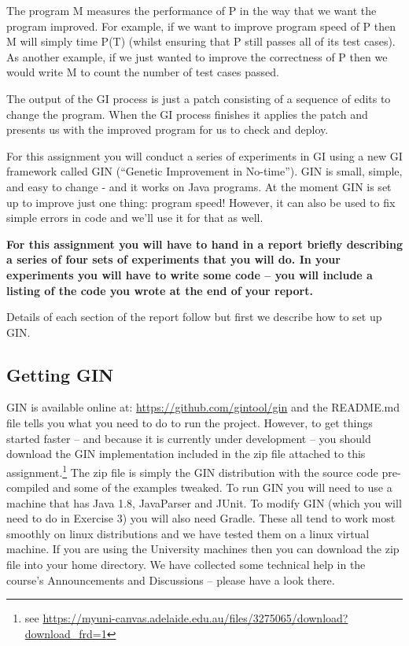 \documentclass{pracs}
\begin{document}
The program M measures the performance of P in the way that we want the program improved. For example, if we want to improve program speed of P then M will simply time P(T) (whilst ensuring that P still passes all of its test cases). As another example, if we just wanted to improve the correctness of P then we would write M to count the number of test cases passed. 

The output of the GI process is just a patch consisting of a sequence of edits to change the program. When the GI process finishes it applies the patch and presents us with the improved program for us to check and deploy. 

For this assignment you will conduct a series of experiments in GI using a new GI framework called GIN (“Genetic Improvement in No-time”). GIN is small, simple, and  easy to change - and it works on Java programs. At the moment GIN is set up to improve just one thing: program speed! However, it can also be used to fix simple errors in code and we’ll use it for that as well. 

\textbf{For this assignment you will have to hand in a report briefly describing a series of four sets of experiments that you will do. In your experiments you will have to write some code -- you will include a listing of the code you wrote at the end of your report. }

Details of each section of the report follow but first we describe how to set up GIN.

\subsection*{Getting GIN}
GIN is available online at: \url{https://github.com/gintool/gin} and the README.md file tells you what you need to do to run the project. However, to get things started faster -- and because it is currently under development -- you should download the GIN implementation included in the zip file attached to this assignment.\footnote{see \url{https://myuni-canvas.adelaide.edu.au/files/3275065/download?download_frd=1}} The zip file is simply the GIN distribution with the source code pre-compiled and some of the examples tweaked. To run GIN you will need to use a machine that has Java 1.8, JavaParser and JUnit. To modify GIN (which you will need to do in Exercise 3) you will also need Gradle. These all tend to work most smoothly on linux distributions and we have tested them on a linux virtual machine. If you are using the University machines then you can download the zip file into your home directory. We have collected some technical help in the course's Announcements and Discussions -- please have a look there.
\end{document}
